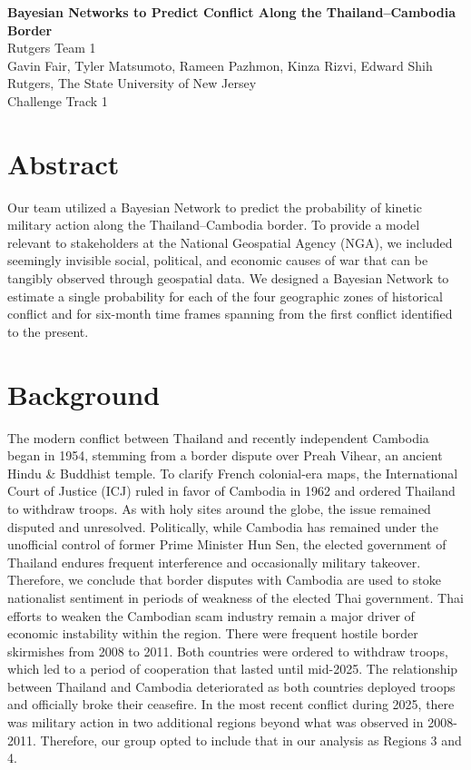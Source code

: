 \documentclass[12pt]{article}
\begin{document}
\begin{center}
    {\Large \textbf{Bayesian Networks to Predict Conflict Along the Thailand--Cambodia Border}} \\[1em]
    {\large Rutgers Team 1} \\[0.5em]
    Gavin Fair, Tyler Matsumoto, Rameen Pazhmon, Kinza Rizvi, Edward Shih \\[0.3em]
    Rutgers, The State University of New Jersey \\[0.3em]
    Challenge Track 1
\end{center}

\vspace{1em}

\section*{Abstract}

Our team utilized a Bayesian Network to predict the probability of kinetic military action along the Thailand--Cambodia border. To provide a model relevant to stakeholders at the National Geospatial Agency (NGA), we included seemingly invisible social, political, and economic causes of war that can be tangibly observed through geospatial data. We designed a Bayesian Network to estimate a single probability for each of the four geographic zones of historical conflict and for six-month time frames spanning from the first conflict identified to the present.

\section*{Background}

The modern conflict between Thailand and recently independent Cambodia began in 1954, stemming from a border dispute over Preah Vihear, an ancient Hindu \& Buddhist temple. To clarify French colonial-era maps, the International Court of Justice (ICJ) ruled in favor of Cambodia in 1962 and ordered Thailand to withdraw troops. As with holy sites around the globe, the issue remained disputed and unresolved. Politically, while Cambodia has remained under the unofficial control of former Prime Minister Hun Sen, the elected government of Thailand endures frequent interference and occasionally military takeover. Therefore, we conclude that border disputes with Cambodia are used to stoke nationalist sentiment in periods of weakness of the elected Thai government. Thai efforts to weaken the Cambodian scam industry remain a major driver of economic instability within the region. There were frequent hostile border skirmishes from 2008 to 2011. Both countries were ordered to withdraw troops, which led to a period of cooperation that lasted until mid-2025. The relationship between Thailand and Cambodia deteriorated as both countries deployed troops and officially broke their ceasefire. In the most recent conflict during 2025, there was military action in two additional regions beyond what was observed in 2008-2011. Therefore, our group opted to include that in our analysis as Regions 3 and 4.
\end{document}
